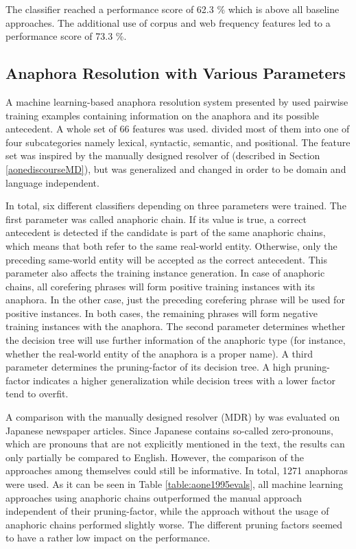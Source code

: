 The classifier reached a performance score of 62.3 \% which is above all baseline approaches. The additional use of corpus and web frequency features led to a performance score of 73.3 \%. 

\subsection{Anaphora Resolution with Various Parameters}
\label{aoneBennetEval}
A machine learning-based anaphora resolution system presented by \cite{aone1995evaluating} used pairwise training examples containing information on the anaphora and its possible antecedent. A whole set of 66 features was used. \cite{aone1995evaluating} divided most of them into one of four subcategories namely lexical, syntactic, semantic, and positional. The feature set was inspired by the manually designed resolver of \cite{aone1993language} (described in Section \ref{aonediscourseMD}), but was generalized and changed in order to be domain and language independent.

In total, six different classifiers depending on three parameters were trained. The first parameter was called anaphoric chain. If its value is true, a correct antecedent is detected if the candidate is part of the same anaphoric chains, which means that both refer to the same real-world entity. Otherwise, only the preceding same-world entity will be accepted as the correct antecedent. This parameter also affects the training instance generation. In case of anaphoric chains, all corefering phrases will form positive training instances with its anaphora. In the other case, just the preceding corefering phrase will be used for positive instances. In both cases, the remaining phrases will form negative training instances with the anaphora. The second parameter determines whether the decision tree will use further information of the anaphoric type (for instance, whether the real-world entity of the anaphora is a proper name). A third parameter determines the pruning-factor of its decision tree. A high pruning-factor indicates a higher generalization while decision trees with a lower factor tend to overfit. 

A comparison with the manually designed resolver (MDR) by \cite{aone1993language} was evaluated on Japanese newspaper articles. Since Japanese contains so-called zero-pronouns, which are pronouns that are not explicitly mentioned in the text, the results can only partially be compared to English. However, the comparison of the approaches among themselves could still be informative. In total, 1271 anaphoras were used. As it can be seen in Table \ref{table:aone1995evals}, all machine learning approaches using anaphoric chains outperformed the manual approach independent of their pruning-factor, while the approach without the usage of anaphoric chains performed slightly worse. The different pruning factors seemed to have a rather low impact on the performance.

